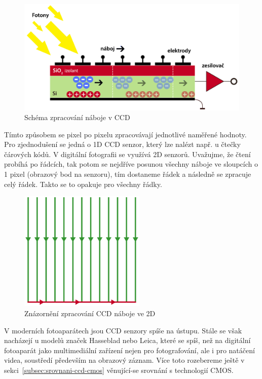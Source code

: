 \documentclass[12pt,a4paper,titlepage,final]{report}
\begin{document}
		\begin{figure}[ht]
\begin{center}
\includegraphics[width=12cm]{images/ccd.pdf}
\caption{Schéma zpracování náboje v CCD}
\label{fig:ccd}
\end{center}
\end{figure}
		
Tímto způsobem se pixel po pixelu zpracovávají jednotlivé naměřené hodnoty. Pro zjednodušení se jedná o 1D CCD senzor, který lze nalézt např. u čtečky čárových kódů. V digitální fotografii se využívá 2D senzorů. Uvažujme, že čtení probíhá po řádcích, tak potom se nejdříve posunou všechny náboje ve sloupcích o 1 pixel (obrazový bod na senzoru), tím dostaneme řádek a následně se zpracuje celý řádek. Takto se to opakuje pro všechny řádky.

\begin{figure}[ht]
\begin{center}
\includegraphics[width=6cm]{images/2dccd.pdf}
\caption{Znázornění zpracování CCD náboje ve 2D}
\label{fig:ccd-2d}
\end{center}
\end{figure}

V moderních fotoaparátech jsou CCD senzory spíše na ústupu. Stále se však nacházejí u modelů značek Hasseblad nebo Leica, které se spíš, než na digitální fotoaparát jako multimediální zařízení nejen pro fotografování, ale i pro natáčení videa, soustředí především na obrazový záznam. Více toto rozebereme ještě v sekci~\ref{subsec:srovnani-ccd-cmos} věnující-se srovnání s technologií CMOS.
\end{document}
